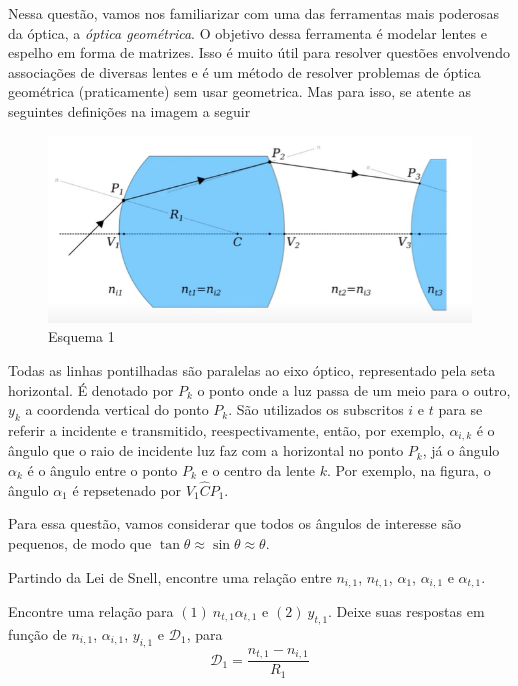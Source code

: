 \documentclass[11pt]{article}
\begin{document}
    \begin{pproblem}
        Nessa questão, vamos nos familiarizar com uma das ferramentas mais poderosas da óptica, a \textit{óptica geométrica}. O objetivo dessa ferramenta é modelar lentes e espelho em forma de matrizes. Isso é muito útil para resolver questões envolvendo associações de diversas lentes e é um método de resolver problemas de óptica geométrica (praticamente) sem usar geometrica. Mas para isso, se atente as seguintes definições na imagem a seguir

        \begin{figure}[H]
            \centering
            \includegraphics[width=0.9\linewidth]{imagens/lentes1.png}
            \caption{Esquema 1}
        \end{figure}

        Todas as linhas pontilhadas são paralelas ao eixo óptico, representado pela seta horizontal. É denotado por \(P_k\) o ponto onde a luz passa de um meio para o outro, \(y_k\) a coordenda vertical do ponto \(P_k\). São utilizados os subscritos \(i\) e \(t\) para se referir a incidente e transmitido, reespectivamente, então, por exemplo, \(\alpha_{i,k}\) é o ângulo que o raio de incidente luz faz com a horizontal no ponto \(P_k\), já o ângulo \(\alpha_k\) é o ângulo entre o ponto \(P_k\) e o centro da lente \(k\). Por exemplo, na figura, o ângulo \(\alpha_1\) é repsetenado por \(V_1\hat{C}P_1\).
        

        Para essa questão, vamos considerar que todos os ângulos de interesse são pequenos, de modo que \(\tan\theta \approx \sin\theta \approx \theta\).
        \begin{alternativas}
            \item Partindo da Lei de Snell, encontre uma relação entre \(n_{i,1}\), \(n_{t,1}\), \(\alpha_1\), \(\alpha_{i,1}\) e \(\alpha_{t,1}\).
        
            \item Encontre uma relação para \((1) \ n_{t,1}\alpha_{t,1}\) e \((2) \ y_{t,1}\). Deixe suas respostas em função de \(n_{i,1}\), \(\alpha_{i,1}\), \(y_{i,1}\) e \(\mathcal{D}_1\), para
            \[\mathcal{D}_1 = \frac{n_{t,1}-n_{i,1}}{R_1}\]


\end{alternativas}
\end{pproblem}
\end{document}
